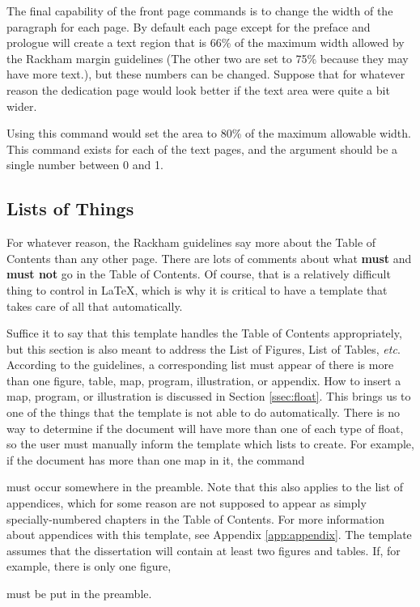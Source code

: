 \documentclass[thesis]{./tex/thesis-umich}
\begin{document}
The final capability of the front page commands is to change the width
of the paragraph for each page.  By default each page except for the
preface and prologue will create a text region that is 66\% of the
maximum width allowed by the Rackham margin guidelines (The other two
are set to 75\% because they may have more text.), but these numbers
can be changed.  Suppose that for whatever reason the dedication page
would look better if the text area were quite a bit wider.
\begin{code}
\end{code}
Using this command would set the area to 80\% of the maximum allowable
width.  This command exists for each of the text pages, and the argument
should be a single number between 0 and 1.


\subsection{Lists of Things}
For whatever reason, the Rackham guidelines say more about the Table of
Contents than any other page.  There are lots of comments about what
\textbf{\textsf{must}} and \textbf{\textsf{must not}} go in the Table
of Contents.  Of course, that is a relatively difficult thing to control
in \LaTeX, which is why it is critical to have a template that takes
care of all that automatically.

Suffice it to say that this template handles the Table of Contents
appropriately, but this section is also meant to address the List of
Figures, List of Tables, \textit{etc}.  According to the guidelines,
a corresponding list must appear of there is more than one figure,
table, map, program, illustration, or appendix.  How to insert a map,
program, or illustration is discussed in Section \ref{ssec:float}.  This
brings us to one of the things that the template is not able to do
automatically.  There is no way to determine if the document will have
more than one of each type of float, so the user must manually inform
the template which lists to create.  For example, if the document has
more than one map in it, the command
\begin{code}
\showlistofmaps
\end{code}
must occur somewhere in the preamble.  Note that this also applies to
the list of appendices, which for some reason are not supposed to
appear as simply specially-numbered chapters in the Table of Contents.
For more information about appendices with this template, see Appendix
\ref{app:appendix}.  The template assumes that the dissertation will
contain at least two figures and tables.  If, for example, there is only
one figure,
\begin{code}
\hidelistoffigures
\end{code}
must be put in the preamble.
\end{document}
